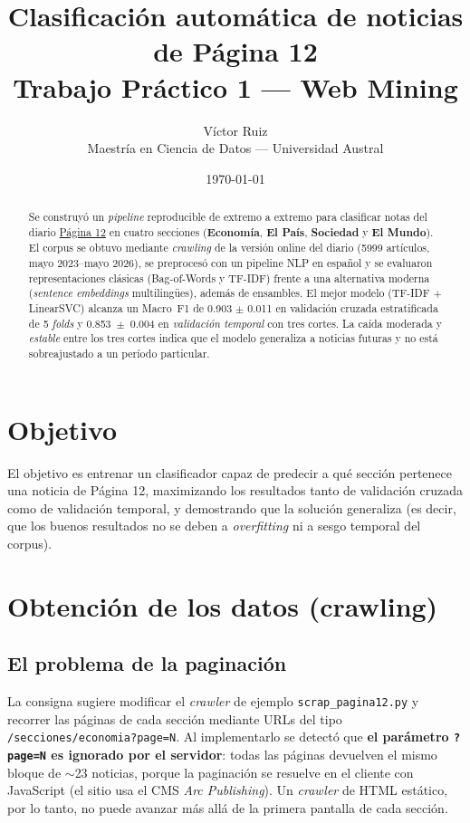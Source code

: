 \documentclass[11pt,a4paper]{article}
\title{\textbf{Clasificación automática de noticias de Página 12}\\
\large Trabajo Práctico 1 --- Web Mining}
\author{Víctor Ruiz\\
\small Maestría en Ciencia de Datos --- Universidad Austral}
\date{\today}
\newcommand{\Ntotal}{5999}
\newcommand{\dateStart}{mayo 2023}
\newcommand{\dateEnd}{mayo 2026}
\newcommand{\bestModel}{TF-IDF + LinearSVC}
\newcommand{\bestCVfone}{0.903 $\pm$ 0.011}
\newcommand{\tempFmean}{0.853}
\newcommand{\tempFstd}{0.004}
\begin{document}
\maketitle

\begin{abstract}
\noindent
Se construyó un \emph{pipeline} reproducible de extremo a extremo para clasificar
notas del diario \href{https://www.pagina12.com.ar}{Página 12} en cuatro secciones
(\textbf{Economía}, \textbf{El País}, \textbf{Sociedad} y \textbf{El Mundo}). El
corpus se obtuvo mediante \emph{crawling} de la versión online del diario
(\Ntotal{} artículos, \dateStart{}--\dateEnd{}), se preprocesó con un pipeline NLP
en español y se evaluaron representaciones clásicas (Bag-of-Words y TF-IDF) frente
a una alternativa moderna (\emph{sentence embeddings} multilingües), además de
ensambles. El mejor modelo (\bestModel{}) alcanza un Macro~F1 de \bestCVfone{} en
validación cruzada estratificada de 5 \emph{folds} y \tempFmean{}~$\pm$~\tempFstd{}
en \emph{validación temporal} con tres cortes. La caída moderada y \emph{estable}
entre los tres cortes indica que el modelo generaliza a noticias futuras y no está
sobreajustado a un período particular.
\end{abstract}

\section{Objetivo}
El objetivo es entrenar un clasificador capaz de predecir a qué sección pertenece
una noticia de Página 12, maximizando los resultados tanto de validación cruzada
como de validación temporal, y demostrando que la solución generaliza (es decir,
que los buenos resultados no se deben a \emph{overfitting} ni a sesgo temporal del
corpus).

\section{Obtención de los datos (crawling)}

\subsection{El problema de la paginación}
La consigna sugiere modificar el \emph{crawler} de ejemplo
\texttt{scrap\_pagina12.py} y recorrer las páginas de cada sección mediante URLs
del tipo \texttt{/secciones/economia?page=N}. Al implementarlo se detectó que
\textbf{el parámetro \texttt{?page=N} es ignorado por el servidor}: todas las
páginas devuelven el mismo bloque de $\sim$23 noticias, porque la paginación se
resuelve en el cliente con JavaScript (el sitio usa el CMS \emph{Arc Publishing}).
Un \emph{crawler} de HTML estático, por lo tanto, no puede avanzar más allá de la
primera pantalla de cada sección.
\end{document}
